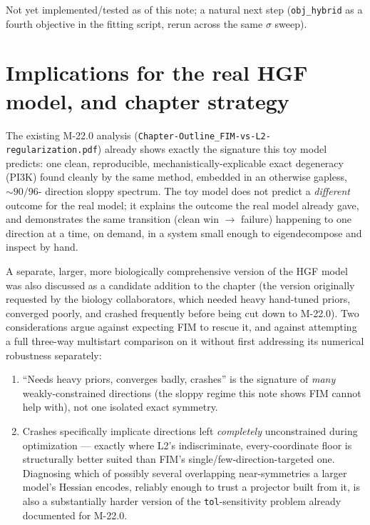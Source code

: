 \documentclass[11pt]{article}
\newcommand{\code}[1]{\texttt{#1}}
\newcommand{\file}[1]{\textcolor{black!60}{\texttt{#1}}}
\begin{document}
Not yet implemented/tested as of this note; a natural next step
(\code{obj\_hybrid} as a fourth objective in the fitting script, rerun across
the same $\sigma$ sweep).

\section{Implications for the real HGF model, and chapter strategy}
\label{sec:real-model}

The existing M-22.0 analysis (\file{Chapter-Outline\_FIM-vs-L2-regularization.pdf})
already shows exactly the signature this toy model predicts: one clean,
reproducible, mechanistically-explicable exact degeneracy (PI3K) found
cleanly by the same method, embedded in an otherwise gapless, $\sim\!90/96$-
direction sloppy spectrum. The toy model does not predict a \emph{different}
outcome for the real model; it explains the outcome the real model already
gave, and demonstrates the same transition (clean win $\to$ failure)
happening to one direction at a time, on demand, in a system small enough to
eigendecompose and inspect by hand.

A separate, larger, more biologically comprehensive version of the HGF model
was also discussed as a candidate addition to the chapter (the version
originally requested by the biology collaborators, which needed heavy
hand-tuned priors, converged poorly, and crashed frequently before being cut
down to M-22.0). Two considerations argue against expecting FIM to rescue it,
and against attempting a full three-way multistart comparison on it without
first addressing its numerical robustness separately:

\begin{enumerate}
\item ``Needs heavy priors, converges badly, crashes'' is the signature of
  \emph{many} weakly-constrained directions (the sloppy regime this note
  shows FIM cannot help with), not one isolated exact symmetry.
\item Crashes specifically implicate directions left \emph{completely}
  unconstrained during optimization --- exactly where L2's indiscriminate,
  every-coordinate floor is structurally better suited than FIM's
  single/few-direction-targeted one. Diagnosing which of possibly several
  overlapping near-symmetries a larger model's Hessian encodes, reliably
  enough to trust a projector built from it, is also a substantially harder
  version of the \code{tol}-sensitivity problem already documented for
  M-22.0.
\end{enumerate}
\end{document}
